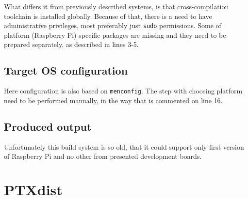\documentclass[printmode]{mgr}
\begin{document}
What differs it from previously described systems, is that cross-compilation toolchain is installed globally.
Because of that, there is a need to have administrative privileges, most preferably just \verb|sudo| permissions.
Some of platform (Raspberry Pi) specific packages are missing and they need to be prepared separately, as described in lines 3-5.

\subsection*{Target OS configuration}

Here configuration is also based on \verb|menconfig|.
The step with choosing platform need to be performed manually, in the way that is commented on line 16.

\subsection*{Produced output}

Unfortunately this build system is so old, that it could support only first version of Raspberry Pi and no other from presented development boards.





\section{PTXdist}


\end{document}
